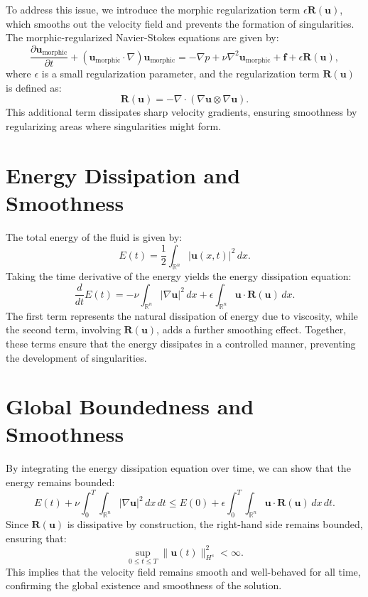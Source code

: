 \documentclass{article}
\begin{document}
To address this issue, we introduce the morphic regularization term \( \epsilon \mathbf{R}(\mathbf{u}) \), which smooths out the velocity field and prevents the formation of singularities. The morphic-regularized Navier-Stokes equations are given by:
\[
\frac{\partial \mathbf{u}_{\text{morphic}}}{\partial t} + (\mathbf{u}_{\text{morphic}} \cdot \nabla) \mathbf{u}_{\text{morphic}} = -\nabla p + \nu \nabla^2 \mathbf{u}_{\text{morphic}} + \mathbf{f} + \epsilon \mathbf{R}(\mathbf{u}),
\]
where \( \epsilon \) is a small regularization parameter, and the regularization term \( \mathbf{R}(\mathbf{u}) \) is defined as:
\[
\mathbf{R}(\mathbf{u}) = -\nabla \cdot (\nabla \mathbf{u} \otimes \nabla \mathbf{u}).
\]
This additional term dissipates sharp velocity gradients, ensuring smoothness by regularizing areas where singularities might form.

\section{Energy Dissipation and Smoothness}

The total energy of the fluid is given by:
\[
E(t) = \frac{1}{2} \int_{\mathbb{R}^n} |\mathbf{u}(x, t)|^2 \, dx.
\]
Taking the time derivative of the energy yields the energy dissipation equation:
\[
\frac{d}{dt} E(t) = - \nu \int_{\mathbb{R}^n} |\nabla \mathbf{u}|^2 \, dx + \epsilon \int_{\mathbb{R}^n} \mathbf{u} \cdot \mathbf{R}(\mathbf{u}) \, dx.
\]
The first term represents the natural dissipation of energy due to viscosity, while the second term, involving \( \mathbf{R}(\mathbf{u}) \), adds a further smoothing effect. Together, these terms ensure that the energy dissipates in a controlled manner, preventing the development of singularities.

\section{Global Boundedness and Smoothness}

By integrating the energy dissipation equation over time, we can show that the energy remains bounded:
\[
E(t) + \nu \int_0^T \int_{\mathbb{R}^n} |\nabla \mathbf{u}|^2 \, dx \, dt \leq E(0) + \epsilon \int_0^T \int_{\mathbb{R}^n} \mathbf{u} \cdot \mathbf{R}(\mathbf{u}) \, dx \, dt.
\]
Since \( \mathbf{R}(\mathbf{u}) \) is dissipative by construction, the right-hand side remains bounded, ensuring that:
\[
\sup_{0 \leq t \leq T} \| \mathbf{u}(t) \|_{H^s}^2 < \infty.
\]
This implies that the velocity field remains smooth and well-behaved for all time, confirming the global existence and smoothness of the solution.
\end{document}
